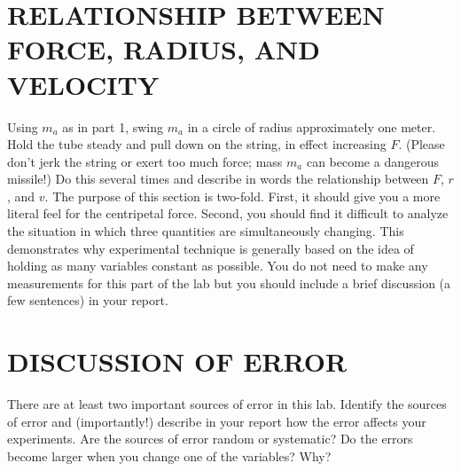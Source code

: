 \documentclass[11pt,letterpaper]{article}
\newcounter{question}[section]
\begin{document}
\section{RELATIONSHIP BETWEEN FORCE, RADIUS, AND VELOCITY}
Using $m_a$ as in part 1, swing $m_a$ in a circle of radius approximately one
meter.  Hold the tube steady and pull down on the string, in
effect increasing $F$.  (Please don't jerk the string or exert too
much force; mass $m_a$ can become a dangerous missile!)  Do this several times
and describe in words the relationship between $F$, $r$, and $v$.  The
purpose of this section is two-fold.  First, it should give you a more literal feel for the centripetal force. Second, you should find it difficult to analyze the situation in which three quantities are simultaneously changing. This demonstrates why experimental technique is generally based on the idea of holding as many variables constant as possible. You do not need to make any measurements for this part of the lab but you should include a brief discussion (a few sentences) in your report.

\section{DISCUSSION OF ERROR}
There are at least two important sources of error in this lab. Identify the sources of error and (importantly!) describe in your report how the error affects your experiments. Are the sources of error random or systematic? Do the errors become larger when you change one of the variables? Why? 










\end{document}
